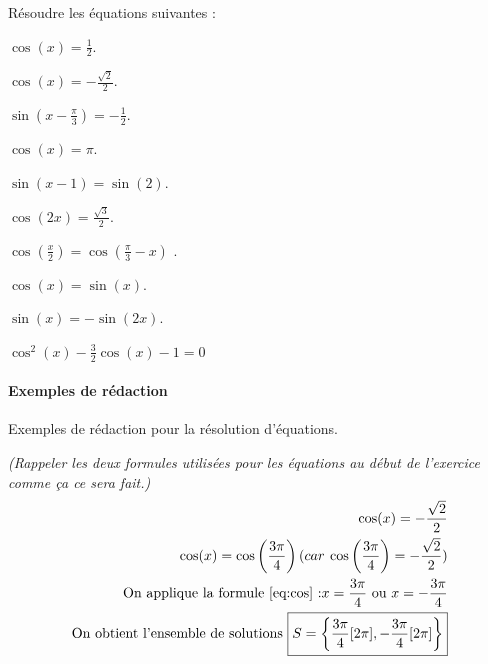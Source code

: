 \documentclass{article}
\begin{document}
\begin{exercice}[\'Equations]
	Résoudre les équations suivantes :
	\begin{multicols}{2}
		\begin{questions}
			\item $\cos(x) = \frac{1}{2}$.
			\item $\cos(x) = -\frac{\sqrt{2}}{2}$.
			\item $\sin(x - \frac{\pi}{3}) = -\frac{1}{2}$.
			\item $\cos(x) = \pi$.
			\item $\sin(x-1) = \sin(2)$.
			\item $\cos(2x) = \frac{\sqrt{3}}{2}$.
			\item $\cos(\frac{x}{2}) = \cos(\frac{\pi}{3}-x)$ .
			\item $\cos(x) = \sin(x)$.
			\item $\sin(x) = -\sin(2x)$.
			\item $\cos^2(x)-\frac{3}{2}\cos(x)-1 = 0$
		\end{questions}
	\end{multicols}

\newpage	
\paragraph*{Exemples de rédaction}

Exemples de rédaction pour la résolution d'équations.

\emph{(Rappeler les deux formules utilisées pour les équations au début de l'exercice comme ça ce sera fait.)}\\




\begin{align*}
\cos(x)  =   -\frac{\sqrt{2}}{2}  \\
\cos(x)   =  \cos\left(\frac{3\pi}{4}\right)  (car\: \cos\left(\frac{3\pi}{4}\right) = -\frac{\sqrt{2}}{2})\\
\text{On applique la formule \ref{eq:cos} :}   x = \frac{3\pi}{4} \text{ ou } x = -\frac{3\pi}{4}\\
\text{On obtient l'ensemble de solutions } \boxed{S = \left\{ \frac{3\pi}{4} [2\pi], -\frac{3\pi}{4} [2\pi] \right\}}
\end{align*}



\begin{center}

\end{center}


\end{exercice}
\end{document}
